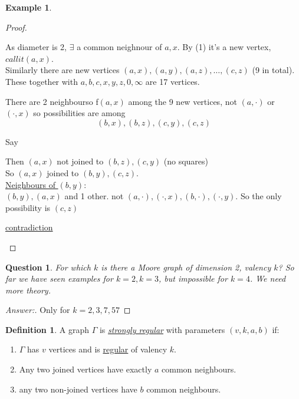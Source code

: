 \documentclass[]{article}
\newtheorem*{quest}{Question}
\theoremstyle{definition}
\newtheorem*{defn}{Definition}
\newtheorem*{exmp}{Example}
\theoremstyle{remark}
\numberwithin{equation}{section}
\begin{document}
\begin{exmp}
\begin{enumerate}
\begin{proof}
\begin{enumerate}
						As diameter is 2, $\exists$ a common neighnour of $a,x$. By (1) it's a new vertex, $call it (a,x)$.\\
						Similarly there are new vertices $(a,x), (a,y), (a,z), \hdots, (c,z)$ (9 in total). These together with $a,b,c,x,y,z,0,\infty$ are 17 vertices.

						There are 2 neighbourso f$(a,x)$ among the 9 new vertices, not $(a, \cdot)$ or $(\cdot, x)$ so possibilities are among
						\[
							(b,x), (b,z), (c,y), (c,z)
						\]

						Say %

						Then $(a,x)$ not joined to $(b,z), (c,y)$ (no squares)\\
						So $(a,x)$ joined to $(b,y), (c,z)$.
						\\
						\underline{Neighbours of $(b,y)$}:\\
							$(b,y), (a,x)$ and 1 other. not $(a,\cdot), (\cdot,x), (b,\cdot), (\cdot,y)$. So the only possibility is $(c,z)$


						\begin{figure}[H]
							\centering
						\end{figure}\underline{contradiction}
					\end{enumerate}
				\end{proof}
				\begin{quest}
					For which $k$ is there a Moore graph of dimension 2, valency $k$? So far we have seen examples for $k=2, k=3$, but impossible for $k=4$. We need more theory.
				\end{quest}
				\begin{proof}[Answer:]
					Only for $k=2,3,7,57$
				\end{proof}

		\end{enumerate}
	\end{exmp}

	\begin{defn}A graph $\Gamma$ is \underline{\emph{strongly regular}} with parameters $(v,k,a,b)$ if:
		\begin{enumerate}
			\item $\Gamma$ has $v$ vertices and is \underline{regular} of valency $k$.
			\item Any two joined vertices have exactly $a$ common neighbours.
			\item any two non-joined vertices have $b$ common neighbours.
		\end{enumerate}
	\end{defn}
\end{document}
